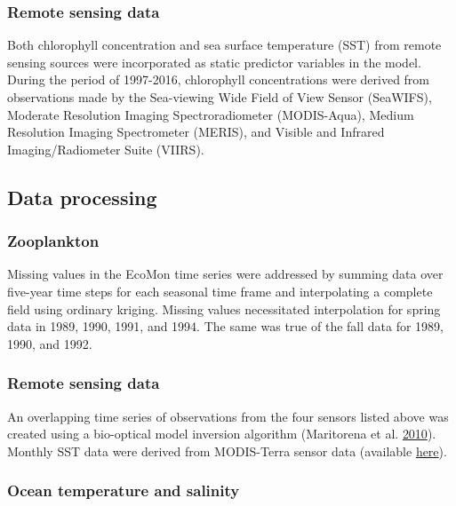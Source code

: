 \documentclass[
]{book}
\begin{document}
\hypertarget{remote-sensing-data}{%
\subsubsection{Remote sensing data}\label{remote-sensing-data}}

Both chlorophyll concentration and sea surface temperature (SST) from remote sensing sources were incorporated as static predictor variables in the model. During the period of 1997-2016, chlorophyll concentrations were derived from observations made by the Sea-viewing Wide Field of View Sensor (SeaWIFS), Moderate Resolution Imaging Spectroradiometer (MODIS-Aqua), Medium Resolution Imaging Spectrometer (MERIS), and Visible and Infrared Imaging/Radiometer Suite (VIIRS).

\hypertarget{data-processing-18}{%
\subsection{Data processing}\label{data-processing-18}}

\hypertarget{zooplankton-1}{%
\subsubsection{Zooplankton}\label{zooplankton-1}}

Missing values in the EcoMon time series were addressed by summing data over five-year time steps for each seasonal time frame and interpolating a complete field using ordinary kriging. Missing values necessitated interpolation for spring data in 1989, 1990, 1991, and 1994. The same was true of the fall data for 1989, 1990, and 1992.

\hypertarget{remote-sensing-data-1}{%
\subsubsection{Remote sensing data}\label{remote-sensing-data-1}}

An overlapping time series of observations from the four sensors listed above was created using a bio-optical model inversion algorithm (Maritorena et al. \protect\hyperlink{ref-Maritorena2010}{2010}). Monthly SST data were derived from MODIS-Terra sensor data (available \href{https://oceancolor.gsfc.nasa.gov/data/terra/}{here}).

\hypertarget{ocean-temperature-and-salinity-1}{%
\subsubsection{Ocean temperature and salinity}\label{ocean-temperature-and-salinity-1}}
\end{document}
